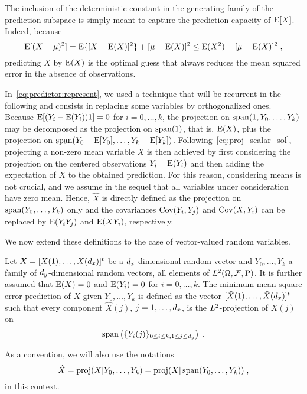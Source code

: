 \begin{rem}
  \label{rem:predlin_nonzeromean}
  The inclusion of the deterministic constant in the generating family of the
  prediction subspace is simply meant to capture the prediction capacity of
  $\operatorname{E}[X]$. Indeed, because
\[
  \operatorname{E}[(X-\mu)^2] = \operatorname{E}\{[X-\operatorname{E}(X)]^2\} + [\mu-\operatorname{E}(X)]^2
\leq \operatorname{E}(X^2) + [\mu-\operatorname{E}(X)]^2 \;,
\]
predicting $X$ by $\operatorname{E}(X)$ is the optimal guess that always reduces the mean
squared error in the absence of observations.

In~\eqref{eq:predictor:represent}, we used a technique that will be recurrent
in the following and consists in replacing some variables by orthogonalized
ones. Because $\operatorname{E}[(Y_i-\operatorname{E}(Y_i))1] = 0$ for $i=0, \dots, k$, the
projection on $\operatorname{span}(1,Y_0, \dots, Y_k)$ may be decomposed as the projection
on $\operatorname{span}(1)$, that is, $\operatorname{E}(X)$, plus the projection on
$\operatorname{span}(Y_0-\operatorname{E}[Y_0], \dots, Y_k-\operatorname{E}[Y_k])$.
Following~\eqref{eq:proj_scalar_sol}, projecting a non-zero mean variable $X$
is then achieved by first considering the projection on the centered
observations $Y_i-\operatorname{E}(Y_i)$ and then adding the expectation of $X$ to the
obtained prediction. For this reason, considering means is not crucial, and we
assume in the sequel that all variables under consideration have zero
mean. Hence, $\hat{X}$ is directly defined as the projection on
$\operatorname{span}(Y_0, \dots, Y_k)$ only and the covariances $\operatorname{Cov}(Y_i,Y_j)$
and $\operatorname{Cov}(X,Y_i)$ can be replaced by $\operatorname{E}(Y_iY_j)$ and $\operatorname{E}(XY_i)$,
respectively.
\end{rem}

We now extend these definitions to the case of vector-valued random variables.

\begin{defi}
  \label{defi:best_linear_prediction}
  Let $X = [X(1), \dotsc, X(d_x)]^t$ be a $d_x$-dimensional random vector
  and $Y_0, \dots, Y_k$ a family of $d_y$-dimensional random vectors, all
  elements of $L^2(\Omega,\mathcal{F},\operatorname{P})$. It is further assumed that
  $\operatorname{E}(X) = 0$ and $\operatorname{E}(Y_i) = 0$ for $i=0,\dots,k$. The minimum mean square
  error prediction of $X$ given $Y_0, \dots, Y_k$ is defined as the vector
  $[\hat{X}(1), \dotsc, \hat{X}(d_x)]^t$ such that every component
  $\hat{X}(j)$, $j=1, \dotsc, d_x$, is the $L^2$-projection of $X(j)$ on
\[
\operatorname{span}\left(\{Y_i(j)\}_{0\leq i \leq k, 1\leq j \leq d_y}\right) \; .
\]

As a convention, we will also use the notations
\[
\hat{X} = \operatorname{proj}({X}|Y_0, \dots, Y_k) = \operatorname{proj}({X}|\operatorname{span}(Y_0, \dots, Y_k)) \; ,
\]
in this context.
\end{defi}

